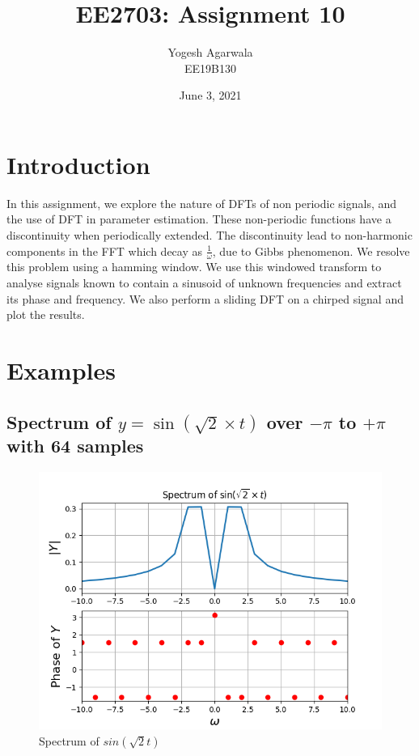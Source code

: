 \documentclass{article}
\title{EE2703: Assignment 10}
\author{Yogesh Agarwala \\ EE19B130}
\date{June 3, 2021}
\begin{document}
\maketitle

\section*{Introduction}
In this assignment, we explore the nature of DFTs of non periodic signals,
and the use of DFT in parameter estimation. These non-periodic functions have a discontinuity when periodically extended. The discontinuity lead to non-harmonic components in the FFT which decay as
\(\frac{1}{\omega}\), due to Gibbs phenomenon. We resolve this problem using a hamming window. We use this windowed transform to analyse signals known to contain a sinusoid of unknown frequencies and extract its phase and frequency. We also perform a sliding DFT on a chirped signal and plot the results.

\clearpage

\section {Examples}

\subsection{Spectrum of $y=\sin\left(\sqrt{2} \times t\right)$ over $-\pi$ to $+\pi$ with 64 samples}

\begin{figure}[h!]
\centering
\includegraphics[scale=0.5]{Figure_1.png}
\caption{Spectrum of $sin(\sqrt{2}t)$}
\label{fig:universe}
\end{figure}
\end{document}
